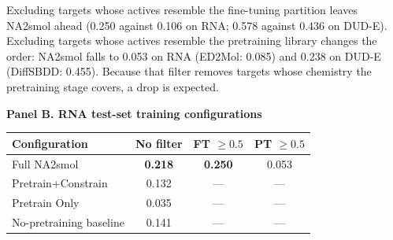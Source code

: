 Excluding targets whose actives resemble the fine-tuning partition leaves NA2smol ahead (0.250 against 0.106 on RNA; 0.578 against 0.436 on DUD-E). Excluding targets whose actives resemble the pretraining library changes the order: NA2smol falls to 0.053 on RNA (ED2Mol: 0.085) and 0.238 on DUD-E (DiffSBDD: 0.455). Because that filter removes targets whose chemistry the pretraining stage covers, a drop is expected.

\textbf{Panel B. RNA test-set training configurations}
\begin{center}\footnotesize
\setlength{\tabcolsep}{5pt}
\begin{tabular}{@{}lccc@{}}
\toprule
\textbf{Configuration} & \textbf{No filter} & \textbf{FT $\geq0.5$} & \textbf{PT $\geq0.5$} \\
\midrule
Full NA2smol            & \textbf{0.218} & \textbf{0.250} & 0.053 \\
Pretrain+Constrain      & 0.132 & --- & --- \\
Pretrain Only           & 0.035 & --- & --- \\
No-pretraining baseline & 0.141 & --- & --- \\
\bottomrule
\end{tabular}\end{center}
